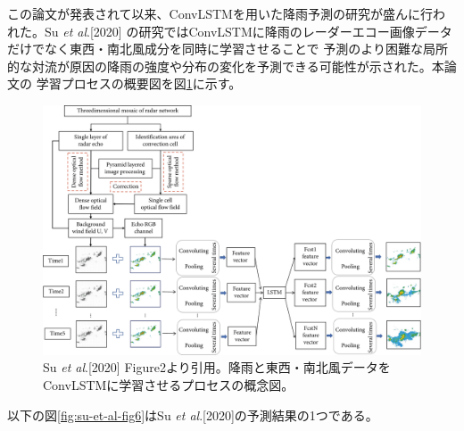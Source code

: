 この論文が発表されて以来、ConvLSTMを用いた降雨予測の研究が盛んに行われた。Su \textit{et al}.[2020]
の研究ではConvLSTMに降雨のレーダーエコー画像データだけでなく東西・南北風成分を同時に学習させることで
予測のより困難な局所的な対流が原因の降雨の強度や分布の変化を予測できる可能性が示された。本論文の
学習プロセスの概要図を図\ref{fig:su-et-al-fig2}に示す。

\begin{figure}[H]
\begin{center}
\includegraphics[width=0.9\linewidth]{fig/intro/su-et-al-flowchart.png}
\captionsetup{width=0.9\linewidth}
\caption{Su \textit{et al}.[2020] Figure2より引用。降雨と東西・南北風データをConvLSTMに学習させるプロセスの概念図。}
\label{fig:su-et-al-fig2}
\end{center}
\end{figure}

以下の図\ref{fig:su-et-al-fig6}はSu \textit{et al}.[2020]の予測結果の1つである。

